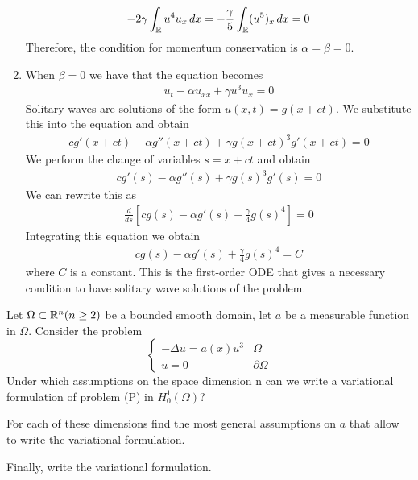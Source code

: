 \begin{enumerate}
\[\begin{split}
            -2\gamma \int_{\mathbb{R}} u^4u_x \, dx = -\frac{\gamma}{5} \int_{\mathbb{R}} (u^5)_x \, dx = 0
        \end{split}
    \]
    Therefore, the condition for momentum conservation is \(\alpha = \beta = 0\).
    \item When \(\beta = 0\) we have that the equation becomes
    \[
        \begin{split}
            u_{t} - \alpha u_{xx} + \gamma u^3u_x = 0
        \end{split}
    \]
    Solitary waves are solutions of the form \(u(x,t) = g(x + ct)\). We substitute this into the equation and obtain
    \[
        \begin{split}
            cg'(x + ct) - \alpha g''(x + ct) + \gamma g(x + ct)^3g'(x + ct) = 0
        \end{split}
    \]
    We perform the change of variables \(s = x + ct\) and obtain
    \[
        \begin{split}
            cg'(s) - \alpha g''(s) + \gamma g(s)^3g'(s) = 0
        \end{split}
    \]
    We can rewrite this as
    \[
        \begin{split}
            \frac{d}{ds} \left[ cg(s) - \alpha g'(s) + \frac{\gamma}{4} g(s)^4 \right] = 0
        \end{split}
    \]
    Integrating this equation we obtain
    \[
        \begin{split}
            cg(s) - \alpha g'(s) + \frac{\gamma}{4} g(s)^4 = C
        \end{split}
    \]
    where \(C\) is a constant. This is the first-order ODE that gives a necessary condition to have solitary wave solutions of the problem.
\end{enumerate}

\newpage
\begin{exercise}
    Let \(\Omega \subset \mathbb{R}^n (n \geq 2)\) be a bounded smooth domain, let \(a\) be a measurable function in \(\Omega\).
    Consider the problem
    \[
        \begin{cases}
            - \Delta u = a(x) u^3 & \Omega \\
            u = 0 & \partial\Omega
        \end{cases}
        \tag*{(P)}
    \]
    Under which assumptions on the space dimension n can we write a variational formulation of problem (P) in
    \(H^1_0(\Omega)\)? 
    
    For each of these dimensions find the most general assumptions on \(a\) that allow to write the variational formulation. 
    
    Finally, write the variational formulation.
    \end{exercise}
    
